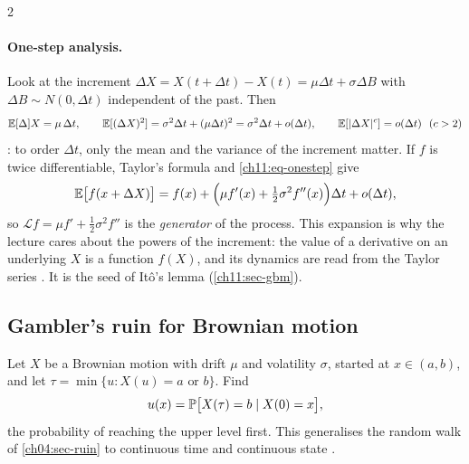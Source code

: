 \begin{paracol}{2}
\paragraph{One-step analysis.} Look at the increment $\Delta X=X(t+\Delta t)-X(t)=\mu\Delta t+\sigma\Delta B$ with
$\Delta B\sim N(0,\Delta t)$ independent of the past. Then
\begin{equation}\label{ch11:eq-onestep}
  \mathbb{E}[\Delta] X=\mu\,\Delta t,\qquad \mathbb{E}[(\Delta X)^2]=\sigma^2\Delta t+(\mu\Delta t)^2=\sigma^2\Delta t+o(\Delta t),\qquad
  \mathbb{E}[|\Delta X|^c]=o(\Delta t)\ \ (c>2)
\end{equation}
: to order $\Delta t$, only the mean and the variance of the
increment matter. If $f$ is twice differentiable, Taylor's formula and \eqref{ch11:eq-onestep} give
\begin{equation}\label{ch11:eq-generator}
  \mathbb{E}\bigl[f(x+\Delta X)\bigr]=f(x)+\Bigl(\mu f'(x)+\tfrac12\sigma^2f''(x)\Bigr)\Delta t+o(\Delta t),
\end{equation}
so $\mathcal Lf=\mu f'+\tfrac12\sigma^2f''$ is the \emph{generator} of the process. This expansion is why the lecture cares about
the powers of the increment: the value of a derivative on an underlying $X$ is a function $f(X)$, and its dynamics are read
from the Taylor series . It is the seed of It\^o's lemma (\cref{ch11:sec-gbm}).

\subsection{Gambler's ruin for Brownian motion}\label{ch11:sec-ruin}
Let $X$ be a Brownian motion with drift $\mu$ and volatility $\sigma$, started at $x\in(a,b)$, and let
$\tau=\min\{u:X(u)=a\text{ or }b\}$. Find
\[
  u(x)=\mathbb{P}\bigl[X(\tau)=b\mid X(0)=x\bigr],
\]
the probability of reaching the upper level first. This generalises the random walk of \cref{ch04:sec-ruin} to continuous
time and continuous state .


\end{paracol}
